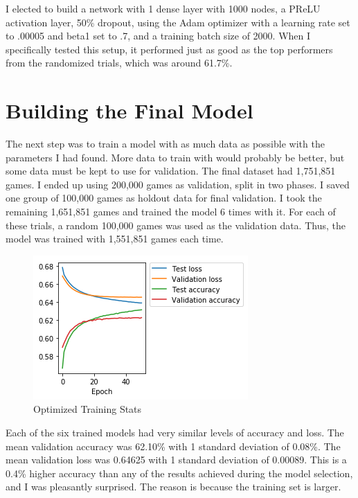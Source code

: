 \documentclass[twoside,twocolumn]{article}
\begin{document}
I elected to build a network with 1 dense layer with 1000 nodes, a PReLU activation layer,  50\% dropout, using the Adam optimizer with a learning rate set to .00005 and beta1 set to .7, and a training batch size of 2000.  When I specifically tested this setup, it performed just as good as the top performers from the randomized trials, which was around 61.7\%.

\section {Building the Final Model}

The next step was to train a model with as much data as possible with the parameters I had found.  More data to train with would probably be better, but some data must be kept to use for validation.  The final dataset had 1,751,851 games.  I ended up using 200,000 games as validation, split in two phases.  I saved one group of 100,000 games as holdout data for final validation.  I took the remaining 1,651,851 games and trained the model 6 times with it.  For each of these trials, a random 100,000 games was used as the validation data.  Thus, the model was trained with 1,551,851 games each time.

\begin{figure}
\caption{Optimized Training Stats}
\label{figure:training}
\begin{adjustbox}{center}
\includegraphics[width=\linewidth]{training}
\end{adjustbox}
\centering
\end{figure}

Each of the six trained models had very similar levels of accuracy and loss.  The mean validation accuracy was 62.10\% with 1 standard deviation of 0.08\%.  The mean validation loss was  0.64625 with 1 standard deviation of 0.00089.  This is a 0.4\% higher accuracy than any of the results achieved during the model selection, and I was pleasantly surprised.  The reason is because the training set is larger.
\end{document}
